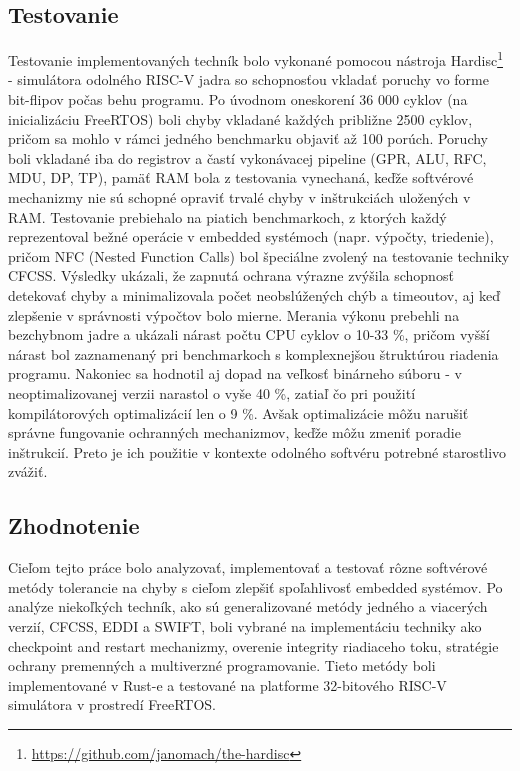 \documentclass[12pt, letterpaper, slovak]{article}
\begin{document}
\subsection*{Testovanie}

Testovanie implementovaných techník bolo vykonané pomocou nástroja Hardisc\footnote{\url{https://github.com/janomach/the-hardisc}} - simulátora odolného RISC-V jadra so schopnosťou vkladať poruchy vo forme bit-flipov počas behu programu. Po úvodnom oneskorení 36 000 cyklov (na inicializáciu FreeRTOS) boli chyby vkladané každých približne 2500 cyklov, pričom sa mohlo v rámci jedného benchmarku objaviť až 100 porúch. Poruchy boli vkladané iba do registrov a častí vykonávacej pipeline (GPR, ALU, RFC, MDU, DP, TP), pamäť RAM bola z testovania vynechaná, keďže softvérové mechanizmy nie sú schopné opraviť trvalé chyby v inštrukciách uložených v RAM. Testovanie prebiehalo na piatich benchmarkoch, z ktorých každý reprezentoval bežné operácie v embedded systémoch (napr. výpočty, triedenie), pričom NFC (Nested Function Calls) bol špeciálne zvolený na testovanie techniky CFCSS. Výsledky ukázali, že zapnutá ochrana výrazne zvýšila schopnosť detekovať chyby a minimalizovala počet neobslúžených chýb a timeoutov, aj keď zlepšenie v správnosti výpočtov bolo mierne. Merania výkonu prebehli na bezchybnom jadre a ukázali nárast počtu CPU cyklov o 10-33 \%, pričom vyšší nárast bol zaznamenaný pri benchmarkoch s komplexnejšou štruktúrou riadenia programu. Nakoniec sa hodnotil aj dopad na veľkosť binárneho súboru - v neoptimalizovanej verzii narastol o vyše 40 \%, zatiaľ čo pri použití kompilátorových optimalizácií len o 9 \%. Avšak optimalizácie môžu narušiť správne fungovanie ochranných mechanizmov, keďže môžu zmeniť poradie inštrukcií. Preto je ich použitie v kontexte odolného softvéru potrebné starostlivo zvážiť.

\subsection*{Zhodnotenie}

Cieľom tejto práce bolo analyzovať, implementovať a testovať rôzne softvérové metódy tolerancie na chyby s cieľom zlepšiť spoľahlivosť embedded systémov. Po analýze niekoľkých techník, ako sú generalizované metódy jedného a viacerých verzií, CFCSS, EDDI a SWIFT, boli vybrané na implementáciu techniky ako checkpoint and restart mechanizmy, overenie integrity riadiaceho toku, stratégie ochrany premenných a multiverzné programovanie. Tieto metódy boli implementované v Rust-e a testované na platforme 32-bitového RISC-V simulátora v prostredí FreeRTOS.
\end{document}
